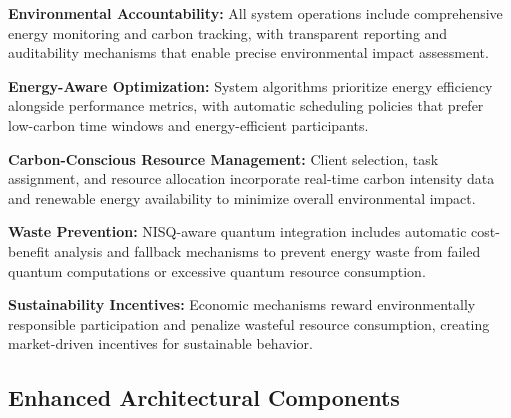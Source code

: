 \documentclass[10pt,journal,compsoc]{IEEEtran}
\begin{document}
\textbf{Environmental Accountability:} All system operations include comprehensive energy monitoring and carbon tracking, with transparent reporting and auditability mechanisms that enable precise environmental impact assessment.

\textbf{Energy-Aware Optimization:} System algorithms prioritize energy efficiency alongside performance metrics, with automatic scheduling policies that prefer low-carbon time windows and energy-efficient participants.

\textbf{Carbon-Conscious Resource Management:} Client selection, task assignment, and resource allocation incorporate real-time carbon intensity data and renewable energy availability to minimize overall environmental impact.

\textbf{Waste Prevention:} NISQ-aware quantum integration includes automatic cost-benefit analysis and fallback mechanisms to prevent energy waste from failed quantum computations or excessive quantum resource consumption.

\textbf{Sustainability Incentives:} Economic mechanisms reward environmentally responsible participation and penalize wasteful resource consumption, creating market-driven incentives for sustainable behavior.

\subsection{Enhanced Architectural Components}
\end{document}

